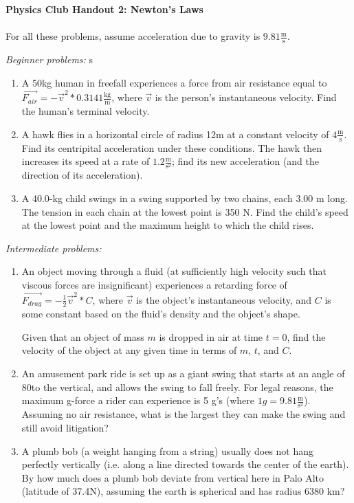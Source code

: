 \documentclass[12pt]{article}
\begin{document}
\textbf{Physics Club Handout 2: Newton's Laws}
\\
\\
For all these problems, assume acceleration due to gravity is $9.81\frac{\text{m}}{\text{s}}$.

\emph{Beginner problems:}
s
\begin{enumerate}
\item
A 50kg human in freefall experiences a force from air resistance equal to $\vec{F_{air}} = -\vec{v}^2*0.3141\frac{\text{kg}}{\text{m}}$, where $\vec{v}$ is the person's instantaneous velocity. Find the human's terminal velocity.

\item
A hawk flies in a horizontal circle of radius 12m at a constant velocity of $4\frac{\text{m}}{\text{s}}$. Find its centripital acceleration under these conditions.
The hawk then increases its speed at a rate of $1.2\frac{\text{m}}{\text{s}^2}$; find its new acceleration (and the direction of its acceleration).

\item
A 40.0-kg child swings in a swing supported by two chains, each 3.00 m long. The tension in each chain at the lowest point is 350 N. Find the child’s speed at the lowest point and the maximum height to which the child rises.

\end{enumerate}

\emph{Intermediate problems:}
\begin{enumerate}
\item
An object moving through a fluid (at sufficiently high velocity such that viscous forces are insignificant) experiences a retarding force of $\vec{F_{drag}} = -\frac{1}{2}\vec{v}^2*C$, where $\vec{v}$ is the object's instantaneous velocity, and $C$ is some constant based on the fluid's density and the object's shape.

Given that an object of mass $m$ is dropped in air at time $t = 0$, find the velocity of the object at any given time in terms of $m$, $t$, and $C$.

\item
An amusement park ride is set up as a giant swing that starts at an angle of 80\degree to the vertical, and allows the swing to fall freely. For legal reasons, the maximum g-force a rider can experience is 5 g's (where $1 g = 9.81\frac{\text{m}}{\text{s}^2}$). Assuming no air resistance, what is the largest they can make the swing and still avoid litigation?

\item
A plumb bob (a weight hanging from a string) usually does not hang perfectly vertically (i.e. along a line directed towards the center of the earth). By how much does a plumb bob deviate from vertical here in Palo Alto (latitude of 37.4\degree N), assuming the earth is spherical and has radius 6380 km?
\end{enumerate}
\end{document}
